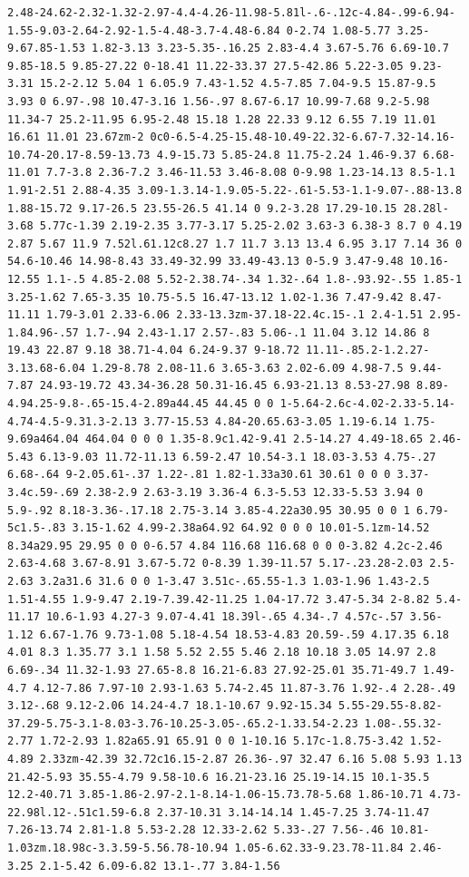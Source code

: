 \documentclass[11pt]{article}
\begin{document}
\begin{enumerate}
\begin{verbatim}
2.48-24.62-2.32-1.32-2.97-4.4-4.26-11.98-5.81l-.6-.12c-4.84-.99-6.94-1.55-9.03-2.64-2.92-1.5-4.48-3.7-4.48-6.84 0-2.74 1.08-5.77 3.25-9.67.85-1.53 1.82-3.13 3.23-5.35-.16.25 2.83-4.4 3.67-5.76 6.69-10.7 9.85-18.5 9.85-27.22 0-18.41 11.22-33.37 27.5-42.86 5.22-3.05 9.23-3.31 15.2-2.12 5.04 1 6.05.9 7.43-1.52 4.5-7.85 7.04-9.5 15.87-9.5 3.93 0 6.97-.98 10.47-3.16 1.56-.97 8.67-6.17 10.99-7.68 9.2-5.98 11.34-7 25.2-11.95 6.95-2.48 15.18 1.28 22.33 9.12 6.55 7.19 11.01 16.61 11.01 23.67zm-2 0c0-6.5-4.25-15.48-10.49-22.32-6.67-7.32-14.16-10.74-20.17-8.59-13.73 4.9-15.73 5.85-24.8 11.75-2.24 1.46-9.37 6.68-11.01 7.7-3.8 2.36-7.2 3.46-11.53 3.46-8.08 0-9.98 1.23-14.13 8.5-1.1 1.91-2.51 2.88-4.35 3.09-1.3.14-1.9.05-5.22-.61-5.53-1.1-9.07-.88-13.8 1.88-15.72 9.17-26.5 23.55-26.5 41.14 0 9.2-3.28 17.29-10.15 28.28l-3.68 5.77c-1.39 2.19-2.35 3.77-3.17 5.25-2.02 3.63-3 6.38-3 8.7 0 4.19 2.87 5.67 11.9 7.52l.61.12c8.27 1.7 11.7 3.13 13.4 6.95 3.17 7.14 36 0 54.6-10.46 14.98-8.43 33.49-32.99 33.49-43.13 0-5.9 3.47-9.48 10.16-12.55 1.1-.5 4.85-2.08 5.52-2.38.74-.34 1.32-.64 1.8-.93.92-.55 1.85-1 3.25-1.62 7.65-3.35 10.75-5.5 16.47-13.12 1.02-1.36 7.47-9.42 8.47-11.11 1.79-3.01 2.33-6.06 2.33-13.3zm-37.18-22.4c.15-.1 2.4-1.51 2.95-1.84.96-.57 1.7-.94 2.43-1.17 2.57-.83 5.06-.1 11.04 3.12 14.86 8 19.43 22.87 9.18 38.71-4.04 6.24-9.37 9-18.72 11.11-.85.2-1.2.27-3.13.68-6.04 1.29-8.78 2.08-11.6 3.65-3.63 2.02-6.09 4.98-7.5 9.44-7.87 24.93-19.72 43.34-36.28 50.31-16.45 6.93-21.13 8.53-27.98 8.89-4.94.25-9.8-.65-15.4-2.89a44.45 44.45 0 0 1-5.64-2.6c-4.02-2.33-5.14-4.74-4.5-9.31.3-2.13 3.77-15.53 4.84-20.65.63-3.05 1.19-6.14 1.75-9.69a464.04 464.04 0 0 0 1.35-8.9c1.42-9.41 2.5-14.27 4.49-18.65 2.46-5.43 6.13-9.03 11.72-11.13 6.59-2.47 10.54-3.1 18.03-3.53 4.75-.27 6.68-.64 9-2.05.61-.37 1.22-.81 1.82-1.33a30.61 30.61 0 0 0 3.37-3.4c.59-.69 2.38-2.9 2.63-3.19 3.36-4 6.3-5.53 12.33-5.53 3.94 0 5.9-.92 8.18-3.36-.17.18 2.75-3.14 3.85-4.22a30.95 30.95 0 0 1 6.79-5c1.5-.83 3.15-1.62 4.99-2.38a64.92 64.92 0 0 0 10.01-5.1zm-14.52 8.34a29.95 29.95 0 0 0-6.57 4.84 116.68 116.68 0 0 0-3.82 4.2c-2.46 2.63-4.68 3.67-8.91 3.67-5.72 0-8.39 1.39-11.57 5.17-.23.28-2.03 2.5-2.63 3.2a31.6 31.6 0 0 1-3.47 3.51c-.65.55-1.3 1.03-1.96 1.43-2.5 1.51-4.55 1.9-9.47 2.19-7.39.42-11.25 1.04-17.72 3.47-5.34 2-8.82 5.4-11.17 10.6-1.93 4.27-3 9.07-4.41 18.39l-.65 4.34-.7 4.57c-.57 3.56-1.12 6.67-1.76 9.73-1.08 5.18-4.54 18.53-4.83 20.59-.59 4.17.35 6.18 4.01 8.3 1.35.77 3.1 1.58 5.52 2.55 5.46 2.18 10.18 3.05 14.97 2.8 6.69-.34 11.32-1.93 27.65-8.8 16.21-6.83 27.92-25.01 35.71-49.7 1.49-4.7 4.12-7.86 7.97-10 2.93-1.63 5.74-2.45 11.87-3.76 1.92-.4 2.28-.49 3.12-.68 9.12-2.06 14.24-4.7 18.1-10.67 9.92-15.34 5.55-29.55-8.82-37.29-5.75-3.1-8.03-3.76-10.25-3.05-.65.2-1.33.54-2.23 1.08-.55.32-2.77 1.72-2.93 1.82a65.91 65.91 0 0 1-10.16 5.17c-1.8.75-3.42 1.52-4.89 2.33zm-42.39 32.72c16.15-2.87 26.36-.97 32.47 6.16 5.08 5.93 1.13 21.42-5.93 35.55-4.79 9.58-10.6 16.21-23.16 25.19-14.15 10.1-35.5 12.2-40.71 3.85-1.86-2.97-2.1-8.14-1.06-15.73.78-5.68 1.86-10.71 4.73-22.98l.12-.51c1.59-6.8 2.37-10.31 3.14-14.14 1.45-7.25 3.74-11.47 7.26-13.74 2.81-1.8 5.53-2.28 12.33-2.62 5.33-.27 7.56-.46 10.81-1.03zm.18.98c-3.3.59-5.56.78-10.94 1.05-6.62.33-9.23.78-11.84 2.46-3.25 2.1-5.42 6.09-6.82 13.1-.77 3.84-1.56 
\end{verbatim}
\end{enumerate}
\end{document}
